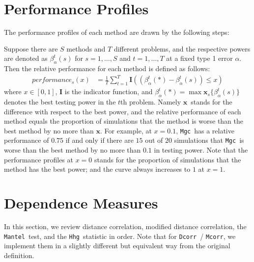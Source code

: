 \documentclass[11pt]{article}
\newcommand{\note}[2][]{\added[#1,remark={#2}]{}}
\providecommand{\sct}[1]{{\sc \texttt{#1}}}
\providecommand{\mb}[1]{\boldsymbol{#1}}
\newcommand{\Mgc}{\sct{Mgc}}
\newcommand{\Hhg}{\sct{Hhg}}
\newcommand{\Dcorr}{\sct{Dcorr}}
\newcommand{\Mcorr}{\sct{Mcorr}}
\newcommand{\Mantel}{\sct{Mantel}}
\newcommand{\cs}[1]{{\note{cs: #1}}}
\newcommand{\mbx}{\ensuremath{\mb{x}}}
\begin{document}
\section{Performance Profiles}
\label{appen:profiles}
The performance profiles of each method are drawn by the following steps:

Suppose there are $S$ methods and $T$ different problems, and the respective powers are denoted as $\beta_{\alpha}^{t}(s)$ for $s=1,\ldots,S$ and $t=1,\ldots,T$ at a fixed type 1 error $\alpha$. Then the relative performance for each method is defined as follows:
\begin{align*}
performance_{s}(x) &= \frac{1}{T} \sum_{t=1}^{T} \mb{I}((\beta_{\alpha}^{t}(*)-\beta_{\alpha}^{t}(s)) \leq x)
\end{align*}
where $x \in [0,1]$, $\mb{I}$ is the indicator function, and $\beta_{\alpha}^{t}(*) =\max \mbx_{s} \{\beta_{\alpha}^{t}(s)\}$ denotes the best testing power in the $t$th problem. Namely \mbx~stands for the difference with respect to the best power, and the relative performance of each method equals the proportion of simulations that the method is worse than the best method by no more than \mbx. For example, at $x=0.1$, \Mgc~has a relative performance of $0.75$ if and only if there are $15$ out of $20$ simulations that \Mgc~is worse than the best method by no more than $0.1$ in testing power. Note that the performance profiles at $x=0$ stands for the proportion of simulations that the method has the best power; and the curve always increases to $1$ at $x=1$. 

\section{Dependence Measures}
\label{appen:methods}

\cs{if we define the generalized correlation coefficient above, then in this section, we should define each measure in terms of what $a_{ij}$ is explicitly. like, each subsection should have an explicit statement/remark: ``Letting X $\leftarrow a_{ij}$, this method is a special case of the generalized correlation coefficient.'' }

In this section, we review distance correlation, modified distance correlation, the \Mantel~test, and the \Hhg~statistic in order. Note that for \Dcorr~/ \Mcorr, we implement them in a slightly different but equivalent way from the original definition.
\end{document}
